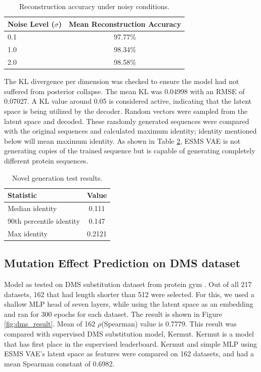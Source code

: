 \documentclass[numsec,webpdf,contemporary,medium]{oup-authoring-template}
\begin{document}
\begin{table}[!ht]
\caption{Reconstruction accuracy under noisy conditions.}\label{tab:noise_test}
\centering
\begin{tabular}{@{}lc@{}}
\toprule
\textbf{Noise Level ($\sigma$)} & \textbf{Mean Reconstruction Accuracy} \\
\midrule
0.1 & 97.77\% \\
1.0 & 98.34\% \\
2.0 & 98.58\% \\
\bottomrule
\end{tabular}
\end{table}

The KL divergence per dimension was checked to ensure the model had not suffered from posterior collapse. The mean KL was 0.04998 with an RMSE of 0.07027. A KL value around 0.05 is considered active, indicating that the latent space is being utilized by the decoder. Random vectors were sampled from the latent space and decoded. These randomly generated sequences were compared with the original sequences and calculated maximum identity; identity mentioned below will mean maximum identity. As shown in Table \ref{tab:novel_generation}, ESMS VAE is not generating copies of the trained sequence but is capable of generating completely different protein sequences.

\begin{table}[!ht]
\caption{Novel generation test results.}\label{tab:novel_generation}
\centering
\begin{tabular}{@{}lc@{}}
\toprule
\textbf{Statistic} & \textbf{Value} \\
\midrule
Median identity & 0.111 \\
90th percentile identity & 0.147\\
Max identity& 0.2121\\
\bottomrule
\end{tabular}
\end{table}

\subsection{Mutation Effect Prediction on DMS dataset}\label{sec:dms}
Model as tested on DMS substitution dataset from protein gym \citep{NEURIPS2023_cac723e5}. Out of all 217 datasets, 162 that had length shorter than 512 were selected. For this, we used a shallow MLP head of seven layers, while using the latent space as an embedding and ran for 300 epochs for each dataset. The result is shown in Figure \ref{fig:dms_result}. Mean of 162 $\rho$(Spearman) value is 0.7779. This result was compared with supervised DMS substitution model, Kermut. Kermut is a model that has first place in the supervised leaderboard. Kermut and simple MLP using ESMS VAE's latent space as features were compared on 162 datasets, and had a mean Spearman constant of 0.6982.
\end{document}

